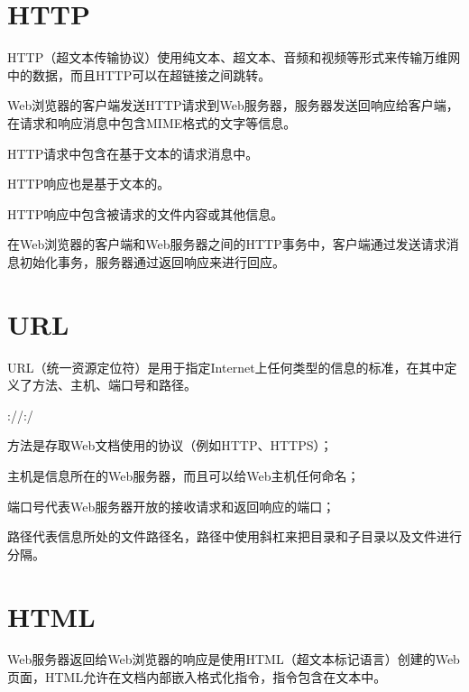 \section{HTTP}

HTTP（超文本传输协议）使用纯文本、超文本、音频和视频等形式来传输万维网中的数据，而且HTTP可以在超链接之间跳转。

Web浏览器的客户端发送HTTP请求到Web服务器，服务器发送回响应给客户端，在请求和响应消息中包含MIME格式的文字等信息。

\begin{compactitem}
\item HTTP请求中包含在基于文本的请求消息中。
\item HTTP响应也是基于文本的。
\item HTTP响应中包含被请求的文件内容或其他信息。
\end{compactitem}

在Web浏览器的客户端和Web服务器之间的HTTP事务中，客户端通过发送请求消息初始化事务，服务器通过返回响应来进行回应。


\section{URL}

URL（统一资源定位符）是用于指定Internet上任何类型的信息的标准，在其中定义了方法、主机、端口号和路径。

\begin{center}
://:/
\end{center}

\begin{compactitem}
\item 方法是存取Web文档使用的协议（例如HTTP、HTTPS）；
\item 主机是信息所在的Web服务器，而且可以给Web主机任何命名；
\item 端口号代表Web服务器开放的接收请求和返回响应的端口；
\item 路径代表信息所处的文件路径名，路径中使用斜杠来把目录和子目录以及文件进行分隔。
\end{compactitem}



\section{HTML}

Web服务器返回给Web浏览器的响应是使用HTML（超文本标记语言）创建的Web页面，HTML允许在文档内部嵌入格式化指令，指令包含在文本中。

